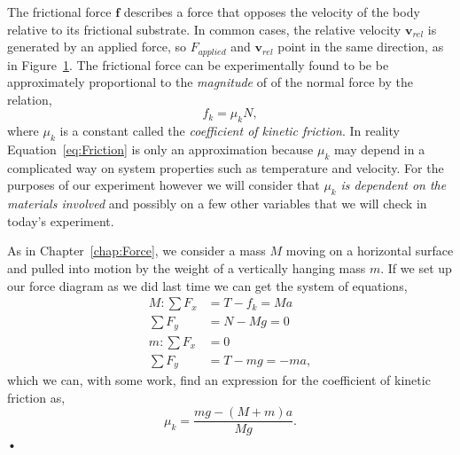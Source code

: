 \documentclass[main.tex]{subfiles}
\begin{document}
\begin{figure}
\centering
{}
\caption{} \label{fig:Friction}
\end{figure}
The frictional force $\boldsymbol{f}$ describes a force that opposes the velocity of the body relative to its frictional substrate. In common cases, the relative velocity $\mathbf{v}_{rel}$ is generated by an applied force, so $F_{applied}$ and $\mathbf{v}_{rel}$ point in the same direction, as in Figure~\ref{fig:Friction}. The frictional force can be experimentally found to be be approximately proportional to the \emph{magnitude} of of the normal force by the relation,
\begin{equation} \label{eq:Friction}
f_k=\mu_kN,
\end{equation}
where $\mu_k$ is a constant called the \emph{coefficient of kinetic friction}. In reality Equation~\eqref{eq:Friction} is only an approximation because $\mu_k$ may depend in a complicated way on system properties such as temperature and velocity.  For the purposes of our experiment however we will consider that $\mu_k$ \emph{is dependent on the materials involved} and possibly on a few other variables that we will check in today's experiment.

As in Chapter~\ref{chap:Force}, we consider a mass $M$ moving on a horizontal surface and pulled into motion by the weight of a vertically hanging mass $m.$ If we set up our force diagram as we did last time we can get the system of equations,
\begin{subequations}
\begin{align}
M: 	\sum F_x &= T-f_k=Ma\\
	\sum F_y &=N-Mg=0\\
m:	\sum F_x &=0\\
	\sum	F_y &=T-mg=-ma,
\end{align}
\end{subequations}
which we can, with some work, find an expression for the coefficient of kinetic friction as,
\begin{equation} \label{eq:muk}
\mu_k=\frac{mg-(M+m)a}{Mg}.
\end{equation}•
\end{document}
